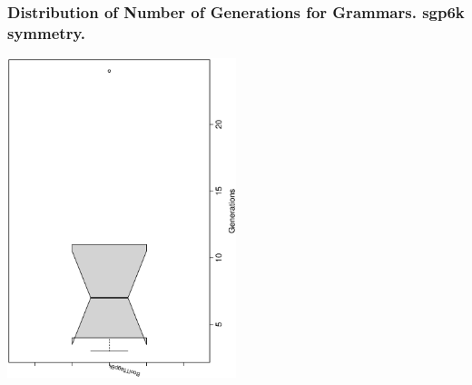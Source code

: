  \begin{frame}
 \frametitle{ Distribution of Number of Generations for Grammars. sgp6k  symmetry. }
 \begin{center}
\includegraphics[width=0.5\textwidth, angle=-90]
{ExpFboxplottGenerations004.eps}
 \end{center}
 \label{ExpFboxplottGenerations004.eps}  
 \end{frame}

